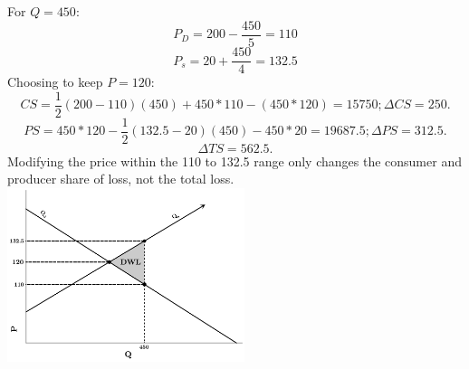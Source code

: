 \documentclass{article}
\begin{document}
	\subsection[d]{}
		For $Q=450:$\\
		$$ P_D = 200 - \frac{450}{5}=110 $$
		$$ P_s = 20+\frac{450}{4} = 132.5 $$
		Choosing to keep $P=120:$
		$$CS =\frac{1}{2}  (200-110)(450) +450*110- (450*120) = 15750; \Delta CS = 250.$$
		$$PS = 450*120 - \frac{1}{2}(132.5-20)(450)-450*20 = 19687.5; \Delta PS = 312.5.$$
		$$\Delta TS = 562.5.$$
		Modifying the price within the 110 to 132.5 range only changes the consumer and producer share of loss, not the total loss. \\
		\includegraphics[height=2in]{Charts/8d}
																
							
															
				
\end{document}

